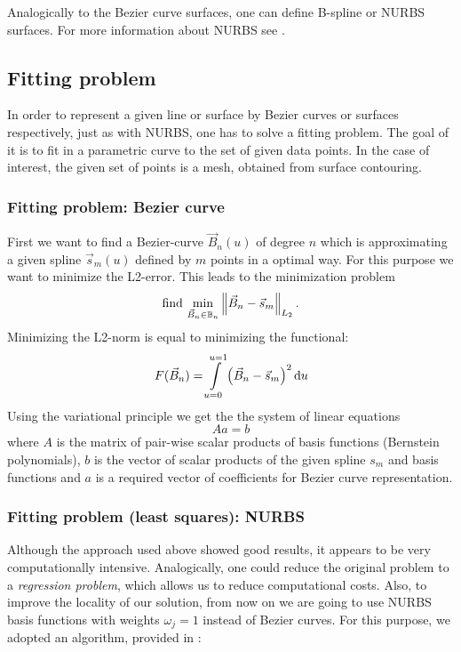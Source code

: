 Analogically to the Bezier curve surfaces, one can define B-spline or NURBS surfaces. For more information about NURBS see \cite{farin1999nurbs}.
\subsection{Fitting problem}
In order to represent a given line or surface by Bezier curves or surfaces respectively, just as with NURBS, one has to solve a fitting problem. The goal of it is to fit in a parametric curve to the set of given data points. In the case of interest, the given set of points is a mesh, obtained from surface contouring.
\subsubsection{Fitting problem: Bezier curve}
First we want to find a Bezier-curve $\vec{B}_n\left(u\right)$ of degree $n$ which is approximating a given spline $\vec{s}_m\left(u\right)$ defined by $m$ points in a optimal way. For this purpose we want to minimize the L2-error. This leads to the minimization problem
\begin{equation}
\text{find\ } \underset{\vec{B}_n\in \mathbb{B}_n}{\min} \Ltwonorm{\vec{B}_n-\vec{s}_m}.
\end{equation}
Minimizing the L2-norm is equal to minimizing the functional:
\begin{equation}
F(\vec{B}_n)=\int\limits_{u=0}^{u=1} \left(\vec{B}_n-\vec{s}_m\right)^2\du
\end{equation}
Using the variational principle we get the the system of linear equations
\begin{equation}
A a = b
\end{equation}
where $A$ is the matrix of pair-wise scalar products of basis functions (Bernstein polynomials), $b$ is the vector of scalar products of the given spline $s_{m}$ and basis functions and $a$ is a required vector of coefficients for Bezier curve representation.

\subsubsection{Fitting problem (least squares): NURBS}
Although the approach used above showed good results, it appears to be very computationally intensive. Analogically, one could reduce the original problem to a \emph{regression problem}, which allows us to reduce computational costs. Also, to improve the locality of our solution, from now on we are going to use NURBS basis functions with weights $\omega_{j} = 1$ instead of Bezier curves. For this purpose, we adopted an algorithm, provided in \cite{becker2011advanced}:

